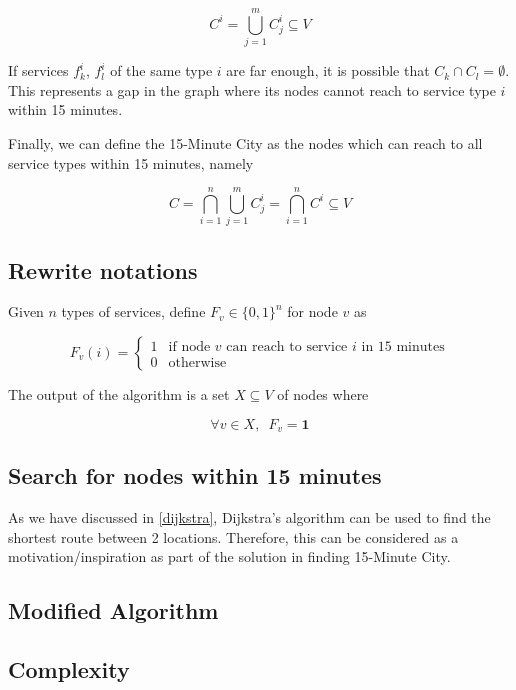 $$ C^i=\bigcup\limits_{j=1}^m C^i_j\subseteq V$$

If services $f^i_k$, $f^i_l$ of the same type $i$ are far enough, it is possible that $C_k\cap C_l=\emptyset$. This represents a gap in the graph where its nodes cannot reach to service type $i$ within 15 minutes.

Finally, we can define the 15-Minute City as the nodes which can reach to all service types within 15 minutes, namely

$$ C=\bigcap\limits_{i=1}^n\bigcup\limits_{j=1}^m C^i_j=\bigcap\limits_{i=1}^n C^i\subseteq V $$

\subsection{Rewrite notations}

Given $n$ types of services, define $F_v\in\{0,1\}^n$ for node $v$ as

$$ F_v(i) = \begin{cases}1&\text{if node }v\text{ can reach to service }i\text{ in 15 minutes}\\0&\text{otherwise}\end{cases} $$

The output of the algorithm is a set $X\subseteq V$ of nodes where

$$ \forall v\in X,\enspace F_v=\mathbf{1} $$

\subsection{Search for nodes within 15 minutes}

As we have discussed in \ref{dijkstra}, Dijkstra's algorithm can be used to find the shortest route between 2 locations. Therefore, this can be considered as a motivation/inspiration as part of the solution in finding 15-Minute City.

\subsection{Modified Algorithm}

\subsection{Complexity}
